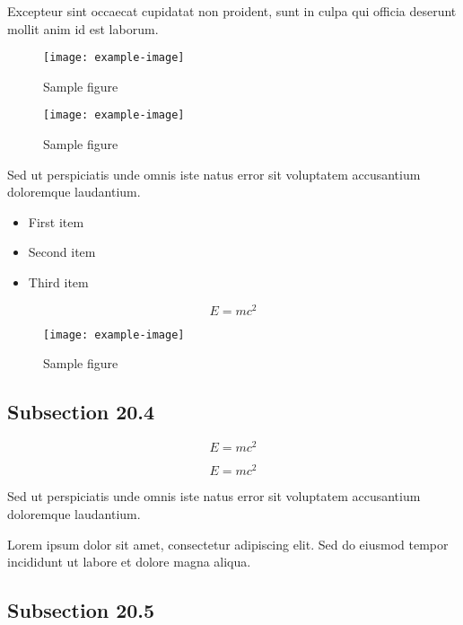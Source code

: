 \documentclass{article}
\begin{document}
Excepteur sint occaecat cupidatat non proident, sunt in culpa qui officia deserunt mollit anim id est laborum.


\begin{figure}[h]
    \centering
    \texttt{[image: example-image]}
    \caption{Sample figure}
    \label{fig:sample}
\end{figure}

\begin{figure}[h]
    \centering
    \texttt{[image: example-image]}
    \caption{Sample figure}
    \label{fig:sample}
\end{figure}

Sed ut perspiciatis unde omnis iste natus error sit voluptatem accusantium doloremque laudantium.

\begin{itemize}
\item First item
\item Second item
\item Third item
\end{itemize}

\begin{equation}
    E = mc^2
\end{equation}

\begin{figure}[h]
    \centering
    \texttt{[image: example-image]}
    \caption{Sample figure}
    \label{fig:sample}
\end{figure}

\subsection{Subsection 20.4}

\begin{equation}
    E = mc^2
\end{equation}

\begin{equation}
    E = mc^2
\end{equation}

Sed ut perspiciatis unde omnis iste natus error sit voluptatem accusantium doloremque laudantium.

Lorem ipsum dolor sit amet, consectetur adipiscing elit. Sed do eiusmod tempor incididunt ut labore et dolore magna aliqua.

\subsection{Subsection 20.5}
\end{document}
